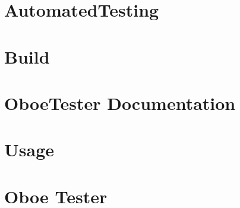 \let\mypdfximage\pdfximage\def\pdfximage{\immediate\mypdfximage}\documentclass[twoside]{book}
\newcommand{\+}{\discretionary{\mbox{\scriptsize$\hookleftarrow$}}{}{}}
\begin{document}
\chapter{Automated\+Testing}
\label{md__c_1__users_fab_src__github_branches__neural_amp_modeler_plugin_i_plug2__dependencies__build_cb846c5e78d45540613ea2ec949e635d}

\chapter{Build}
\label{md__c_1__users_fab_src__github_branches__neural_amp_modeler_plugin_i_plug2__dependencies__build_9ee2f183b0fe5bfcee5752c9394d82d4}

\chapter{Oboe\+Tester Documentation}
\label{md__c_1__users_fab_src__github_branches__neural_amp_modeler_plugin_i_plug2__dependencies__build_7fec9a5e8ab6e18875c64e95cf95dd16}

\chapter{Usage}
\label{md__c_1__users_fab_src__github_branches__neural_amp_modeler_plugin_i_plug2__dependencies__build_c10efd612108ccbf81fab678f74f4b0d}

\chapter{Oboe Tester}
\label{md__c_1__users_fab_src__github_branches__neural_amp_modeler_plugin_i_plug2__dependencies__build_78a2ad4ecacacd768597967c5396b166}

\end{document}
